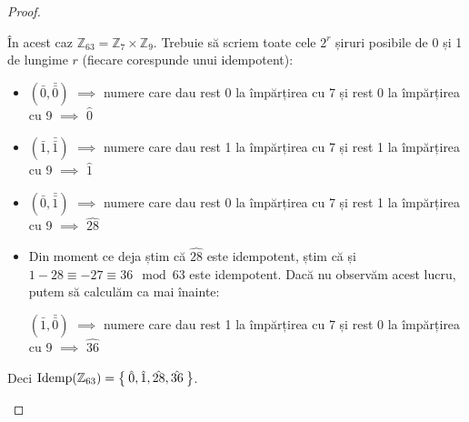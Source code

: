 \documentclass[11pt]{article}
\theoremstyle{definition}
\begin{document}
\begin{proof}
\begin{itemize}
    În acest caz \(\mathbb{Z}_{63} = \mathbb{Z}_{7} \times \mathbb{Z}_{9}\).
    Trebuie să scriem toate cele \(2^r\) șiruri posibile de 0 și 1 de lungime \(r\) (fiecare corespunde unui idempotent):
    \begin{itemize}
        \item \((\bar{0}, \bar{\bar{0}})\) \(\implies\) numere care dau rest 0 la împărțirea cu 7 și rest 0 la împărțirea cu 9 \(\implies\) \(\hat{0}\)
        \item \((\bar{1}, \bar{\bar{1}})\) \(\implies\) numere care dau rest 1 la împărțirea cu 7 și rest 1 la împărțirea cu 9 \(\implies\) \(\hat{1}\)
        \item \((\bar{0}, \bar{\bar{1}})\) \(\implies\) numere care dau rest 0 la împărțirea cu 7 și rest 1 la împărțirea cu 9 \(\implies\) \(\hat{28}\)
        \item Din moment ce deja știm că \(\hat{28}\) este idempotent, știm că și \(1 - 28 \equiv -27 \equiv 36 \mod 63\) este idempotent. Dacă nu observăm acest lucru, putem să calculăm ca mai înainte:
        
        \((\bar{1}, \bar{\bar{0}})\) \(\implies\) numere care dau rest 1 la împărțirea cu 7 și rest 0 la împărțirea cu 9 \(\implies\) \(\hat{36}\)
    \end{itemize}
    
    Deci \(\text{Idemp}(\mathbb{Z}_{63}) = \Set{ \hat{0}, \hat{1}, \hat{28}, \hat{36} }\).
\end{itemize}

\end{proof}
\end{document}
